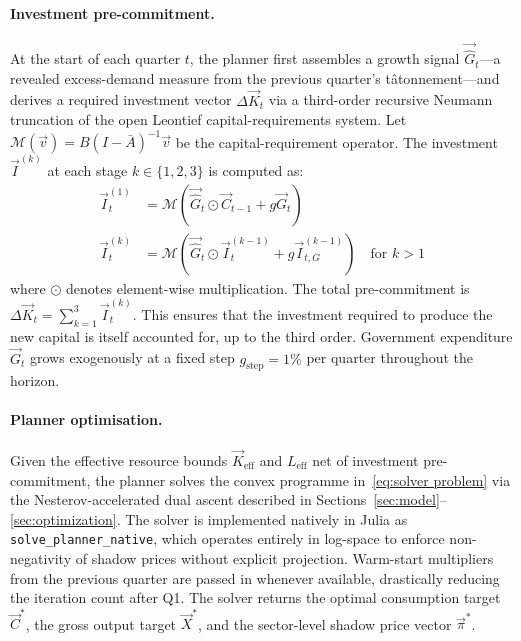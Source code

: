 \paragraph{Investment pre-commitment.}
At the start of each quarter $t$, the planner first assembles a growth
signal $\vec{\hat{G}}_t$---a revealed excess-demand measure from the previous quarter's tâtonnement---and
derives a required investment vector $\Delta\vec{K}_t$ via a
third-order recursive Neumann truncation of the open Leontief capital-requirements
system. Let $\mathcal{M}(\vec{v}) = B(I-\bar{A})^{-1} \vec{v}$ be the capital-requirement
operator. The investment $\vec{I}^{(k)}$ at each stage $k \in \{1,2,3\}$ is computed as:
\begin{align}
  \vec{I}^{(1)}_t &= \mathcal{M}(\vec{\hat{G}}_t \odot \vec{C}_{t-1} + g \vec{G}_{t}) \\
  \vec{I}^{(k)}_t &= \mathcal{M}(\vec{\hat{G}}_t \odot \vec{I}^{(k-1)}_t + g \vec{I}^{(k-1)}_{t, G}) \quad \text{for } k > 1
\end{align}
where $\odot$ denotes element-wise multiplication. The total pre-commitment is $\Delta\vec{K}_t = \sum_{k=1}^3 \vec{I}^{(k)}_t$. This ensures that the investment required to produce the new capital is itself accounted for, up to the third order.
Government expenditure $\vec{G}_t$ grows exogenously at a fixed step $g_{\text{step}}
= 1\%$ per quarter throughout the horizon.

\paragraph{Planner optimisation.}
Given the effective resource bounds $\vec{K}_{\text{eff}}$ and $L_{\text{eff}}$
net of investment pre-commitment, the planner solves the convex programme
in~\eqref{eq:solver problem} via the Nesterov-accelerated dual ascent
described in Sections~\ref{sec:model}--\ref{sec:optimization}.
The solver is implemented natively in Julia as \texttt{solve\_planner\_native},
which operates entirely in log-space to enforce non-negativity of shadow
prices without explicit projection.
Warm-start multipliers from the previous quarter are passed in whenever
available, drastically reducing the iteration count after Q1.
The solver returns the optimal consumption target $\vec{C}^*$, the gross
output target $\vec{X}^*$, and the sector-level shadow price vector $\vec{\pi}^*$.

